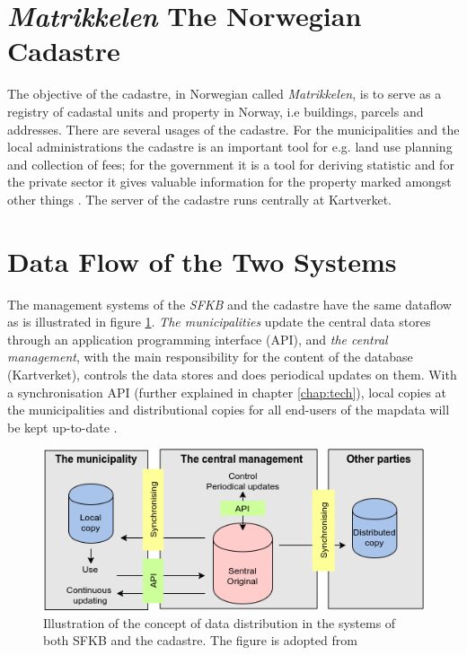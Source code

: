 
\section{\textit{Matrikkelen} The Norwegian Cadastre}\label{cadastre}

The objective of the cadastre, in Norwegian called \textit{Matrikkelen}, is to serve as a registry of cadastal units and property in Norway, i.e buildings, parcels and addresses. There are several usages of  the cadastre. For the municipalities and the local administrations the cadastre is an important tool for e.g. land use planning and collection of fees; for the government it is a tool for deriving statistic and for the private sector it gives valuable information for the property marked amongst other things \citep{Mjos2002}. The server of the cadastre runs centrally at Kartverket.  


\section{Data Flow of the Two Systems}
The management systems of the \textit{SFKB} and the cadastre have the same dataflow as is illustrated in figure \ref{fig:konsept}. \textit{The municipalities}  update the central data stores through an application programming interface (API), and \textit{the central management}, with the main responsibility for the content of the database (Kartverket), controls the data stores and does periodical updates on them. With a synchronisation API (further explained in chapter \ref{chap:tech}), local copies at the municipalities and distributional copies for all end-users of the mapdata will be kept up-to-date \citep{Kartverket2015}.


\begin{figure}[H]
	\centering
	\includegraphics[scale=0.8]{img/consept.png}
	\caption{Illustration of the concept of data distribution in the systems of both SFKB and the cadastre. The figure is adopted from \cite{Kartverket2015} }
	\label{fig:konsept}
\end{figure}


